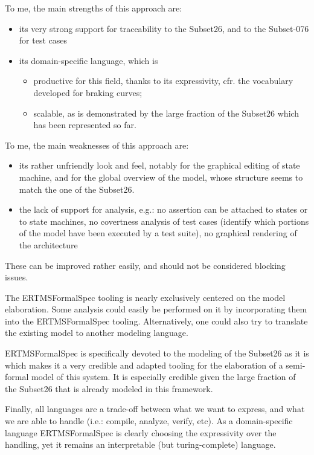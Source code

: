 \begin{assessor1}
To me, the main strengths of this approach are: 
\begin{itemize}
\item its very strong support for traceability to the Subset26, and to the Subset-076 for test cases
\item its domain-specific language, which is
\begin{itemize}
\item productive for this field, thanks to its expressivity, cfr. the vocabulary developed for braking curves; 
\item scalable, as is demonstrated by the large fraction of the Subset26 which has been represented so far. 
\end{itemize}
\end{itemize}

To me, the main weaknesses of this approach are: 
\begin{itemize}
\item its rather unfriendly look and feel, notably for the graphical editing of state machine, and for the global overview of the model, whose structure seems to match the one of the Subset26. 
\item the lack of support for analysis, e.g.: no assertion can be attached to states or to state machines, no covertness analysis of test cases (identify which portions of the model have been executed by a test suite), no graphical rendering of the architecture
\end{itemize}
These can be improved rather easily, and should not be considered blocking issues. 

The ERTMSFormalSpec tooling is nearly exclusively centered on the model elaboration. Some analysis could easily be performed on it by incorporating them into the ERTMSFormalSpec tooling. Alternatively, one could also try to translate the existing model to another modeling language. 

ERTMSFormalSpec is specifically devoted to the modeling of the Subset26 as it is which makes it a very credible and adapted tooling for the elaboration of a semi-formal model of this system. It is especially credible given the large fraction of the Subset26 that is already modeled in this framework. 

Finally, all languages are a trade-off between what we want to express, and what we are able to handle (i.e.: compile, analyze, verify, etc). As a domain-specific language ERTMSFormalSpec is clearly choosing the expressivity over the handling, yet it remains an interpretable (but turing-complete) language.
\end{assessor1}

